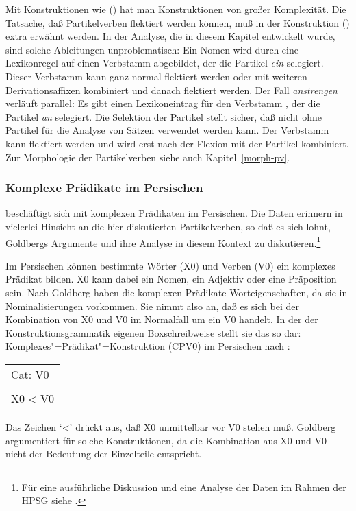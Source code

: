 Mit Konstruktionen wie () hat man Konstruktionen von großer Komplexität.
Die Tatsache, daß Partikelverben flektiert werden können, muß in der Konstruktion
() extra erwähnt werden. In der Analyse, die in diesem Kapitel entwickelt
wurde, sind solche Ableitungen unproblematisch: Ein Nomen wird durch eine
Lexikonregel auf einen Verbstamm abgebildet, der die Partikel \emph{ein} selegiert.
Dieser Verbstamm kann ganz normal flektiert werden oder mit weiteren Derivationsaffixen
kombiniert und danach flektiert werden. Der Fall \emph{anstrengen} verläuft parallel:
Es gibt einen Lexikoneintrag für den Verbstamm , der die Partikel \emph{an}
selegiert. Die Selektion der Partikel stellt sicher, daß  nicht ohne Partikel für die
Analyse von Sätzen verwendet werden kann. Der Verbstamm kann flektiert werden
und wird erst nach der Flexion mit der Partikel kombiniert.
Zur Morphologie der Partikelverben siehe auch Kapitel~\ref{morph-pv}.
%
%
%


\subsubsection{Komplexe Prädikate im Persischen}
\label{sec-cp-persisch}

\citet{Goldberg2003a} beschäftigt sich mit komplexen Prädikaten im Persischen.
Die Daten erinnern in vielerlei Hinsicht an die hier diskutierten Partikelverben, so daß
es sich lohnt, Goldbergs Argumente und ihre Analyse in diesem Kontext zu diskutieren.\footnote{
  Für eine ausführliche Diskussion und eine Analyse der Daten im Rahmen der HPSG siehe .
}

Im Persischen können bestimmte Wörter (X0) und Verben (V0) ein komplexes Prädikat bilden.
X0 kann dabei ein Nomen, ein Adjektiv oder eine Präposition sein. Nach Goldberg haben die
komplexen Prädikate Worteigenschaften, da sie in Nominalisierungen vorkommen. Sie nimmt also an,
daß es sich bei der Kombination von X0 und V0 im Normalfall um ein V0 handelt. In der
der Konstruktionsgrammatik eigenen Boxschreibweise stellt sie das so dar:
\eas
Komplexes"=Prädikat"=Konstruktion (CPV0) im Persischen nach :\\
\begin{tabular}{|l|}\hline
Cat: V0  \\
         \\
X0  <  V0\\\hline
\end{tabular}
\zs
Das Zeichen `<' drückt aus, daß X0 unmittelbar vor V0 stehen muß. Goldberg argumentiert
für solche Konstruktionen, da die Kombination aus X0 und V0 nicht der Bedeutung der
Einzelteile entspricht.

